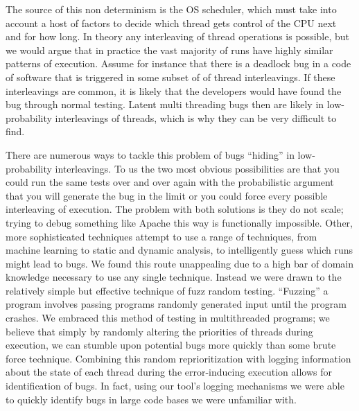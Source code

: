 \documentclass[10pt,]{article} %
\begin{document}

	The source of this non determinism is the OS scheduler, which must take into account a host of factors to decide which thread gets control of the CPU next and for how long.  In theory any interleaving of thread operations is possible, but we would argue that in practice the vast majority of runs have highly similar patterns of execution.  Assume for instance that there is a deadlock bug in a code of software that is triggered in some subset of of thread interleavings. If these interleavings are common, it is likely that the developers would have found the bug through normal testing.  Latent multi threading bugs then are likely in low-probability interleavings of threads, which is why they can be very difficult to find.   




	There are numerous ways to tackle this problem of bugs “hiding” in low-probability interleavings.  To us the two most obvious possibilities are that you could run the same tests over and over again with the probabilistic argument that you will generate the bug in the limit or you could force every possible interleaving of execution.  The problem with both solutions is they do not scale; trying to debug something like Apache this way is functionally impossible.  Other, more sophisticated techniques attempt to use a range of techniques, from machine learning to static and dynamic analysis, to intelligently guess which runs might lead to bugs.  We found this route unappealing due to a high bar of domain knowledge necessary to use any single technique.  Instead we were drawn to the relatively simple but effective technique of fuzz random testing.  “Fuzzing” a program involves passing programs randomly generated input until the program crashes.  We embraced this method of testing in multithreaded programs; we believe that simply by randomly altering the priorities of threads during execution, we can stumble upon potential bugs more quickly than some brute force technique.  Combining this random reprioritization with logging information about the state of each thread during the error-inducing execution allows for identification of bugs.  In fact, using our tool’s logging mechanisms we were able to quickly identify bugs in large code bases we were unfamiliar with.  
\end{document}
